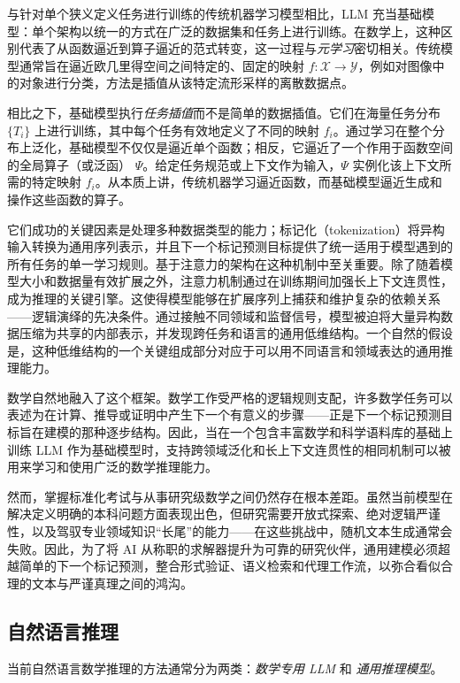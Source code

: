 \documentclass[11pt]{article}
\numberwithin{equation}{section}
\begin{document}
与针对单个狭义定义任务进行训练的传统机器学习模型相比，LLM 充当基础模型：单个架构以统一的方式在广泛的数据集和任务上进行训练。在数学上，这种区别代表了从函数逼近到算子逼近的范式转变，这一过程与\textit{元学习}密切相关。传统模型通常旨在逼近欧几里得空间之间特定的、固定的映射 $f: \mathcal{X} \to \mathcal{Y}$，例如对图像中的对象进行分类，方法是插值从该特定流形采样的离散数据点。

相比之下，基础模型执行\textit{任务插值}而不是简单的数据插值。它们在海量任务分布 $\{T_i\}$ 上进行训练，其中每个任务有效地定义了不同的映射 $f_i$。通过学习在整个分布上泛化，基础模型不仅仅是逼近单个函数；相反，它逼近了一个作用于函数空间的全局算子（或泛函） $\Psi$。给定任务规范或上下文作为输入，$\Psi$ 实例化该上下文所需的特定映射 $f_i$。从本质上讲，传统机器学习逼近函数，而基础模型逼近生成和操作这些函数的算子。

它们成功的关键因素是处理多种数据类型的能力；标记化（tokenization）将异构输入转换为通用序列表示，并且下一个标记预测目标提供了统一适用于模型遇到的所有任务的单一学习规则。基于注意力的架构在这种机制中至关重要。除了随着模型大小和数据量有效扩展之外，注意力机制通过在训练期间加强长上下文连贯性，成为推理的关键引擎。这使得模型能够在扩展序列上捕获和维护复杂的依赖关系——逻辑演绎的先决条件。通过接触不同领域和监督信号，模型被迫将大量异构数据压缩为共享的内部表示，并发现跨任务和语言的通用低维结构。一个自然的假设是，这种低维结构的一个关键组成部分对应于可以用不同语言和领域表达的通用推理能力。

数学自然地融入了这个框架。数学工作受严格的逻辑规则支配，许多数学任务可以表述为在计算、推导或证明中产生下一个有意义的步骤——正是下一个标记预测目标旨在建模的那种逐步结构。因此，当在一个包含丰富数学和科学语料库的基础上训练 LLM 作为基础模型时，支持跨领域泛化和长上下文连贯性的相同机制可以被用来学习和使用广泛的数学推理能力。

然而，掌握标准化考试与从事研究级数学之间仍然存在根本差距。虽然当前模型在解决定义明确的本科问题方面表现出色，但研究需要开放式探索、绝对逻辑严谨性，以及驾驭专业领域知识“长尾”的能力——在这些挑战中，随机文本生成通常会失败。因此，为了将 AI 从称职的求解器提升为可靠的研究伙伴，通用建模必须超越简单的下一个标记预测，整合形式验证、语义检索和代理工作流，以弥合看似合理的文本与严谨真理之间的鸿沟。

\subsection{自然语言推理}\label{subsec:nlr}

当前自然语言数学推理的方法通常分为两类：\textit{数学专用 LLM} 和 \textit{通用推理模型}。
\end{document}
